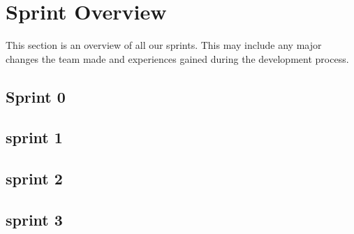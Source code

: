 \section{Sprint Overview}
This section is an overview of all our sprints. This may include any major changes the team made and experiences gained during the development process. 

\subsection{Sprint 0}

\subsection{sprint 1}

\subsection{sprint 2}

\subsection{sprint 3}
